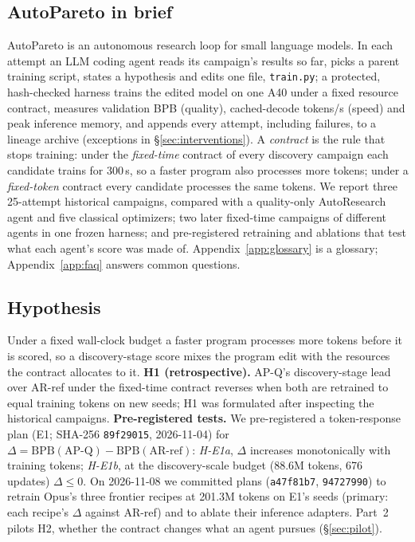 \documentclass{article}
\begin{document}
\subsection{AutoPareto in brief}\label{sec:brief}
AutoPareto is an autonomous research loop for small language models. In each attempt an LLM coding agent reads its campaign's results so far, picks a parent training script, states a hypothesis and edits one file, \texttt{train.py}; a protected, hash-checked harness trains the edited model on one A40 under a fixed resource contract, measures validation BPB (quality), cached-decode tokens/s (speed) and peak inference memory, and appends every attempt, including failures, to a lineage archive (exceptions in \S\ref{sec:interventions}). A \emph{contract} is the rule that stops training: under the \emph{fixed-time} contract of every discovery campaign each candidate trains for 300\,s, so a faster program also processes more tokens; under a \emph{fixed-token} contract every candidate processes the same tokens. We report three 25-attempt historical campaigns, compared with a quality-only AutoResearch agent and five classical optimizers; two later fixed-time campaigns of different agents in one frozen harness; and pre-registered retraining and ablations that test what each agent's score was made of. Appendix~\ref{app:glossary} is a glossary; Appendix~\ref{app:faq} answers common questions.

\subsection{Hypothesis}
Under a fixed wall-clock budget a faster program processes more tokens before it is scored, so a discovery-stage score mixes the program edit with the resources the contract allocates to it.
\textbf{H1 (retrospective).} AP-Q's discovery-stage lead over AR-ref under the fixed-time contract reverses when both are retrained to equal training tokens on new seeds; H1 was formulated after inspecting the historical campaigns.
\textbf{Pre-registered tests.} We pre-registered a token-response plan (E1; SHA-256 \texttt{89f29015}, 2026-11-04) for $\Delta=\mathrm{BPB}(\text{AP-Q})-\mathrm{BPB}(\text{AR-ref})$: \emph{H-E1a}, $\Delta$ increases monotonically with training tokens; \emph{H-E1b}, at the discovery-scale budget (88.6M tokens, 676 updates) $\Delta\le0$. On 2026-11-08 we committed plans (\texttt{a47f81b7}, \texttt{94727990}) to retrain Opus's three frontier recipes at 201.3M tokens on E1's seeds (primary: each recipe's $\Delta$ against AR-ref) and to ablate their inference adapters. Part~2 pilots H2, whether the contract changes what an agent pursues (\S\ref{sec:pilot}).
\end{document}
